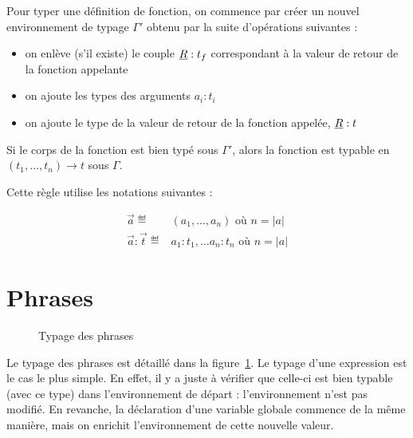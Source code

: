 Pour typer une définition de fonction, on commence par créer un nouvel
environnement de typage $Γ'$ obtenu par la suite d'opérations suivantes :

\begin{itemize}
\item
  on enlève (s'il existe) le couple $\vRet : t_f$ correspondant à la
  valeur de retour de la fonction appelante
\item
  on ajoute les types des arguments $a_i : t_i$
\item
  on ajoute le type de la valeur de retour de la fonction appelée,
  $\vRet : t$
\end{itemize}

Si le corps de la fonction est bien typé sous $Γ'$, alors la fonction est
typable en $(t_1, …, t_n) → t$ sous $Γ$.

\begin{mathpar}
\end{mathpar}

Cette règle utilise les notations suivantes :

\begin{align*}
\vec{a}
\eqdef &
(a_1, …, a_n) \textrm{ où } n = |a|
\\
\vec{a} : \vec{t}
\eqdef &
a_1: t_1,…
a_n: t_n \textrm{ où } n = |a|
\end{align*}


\section{Phrases}

\begin{figure}


  \begin{mathpar}

  \end{mathpar}

  \caption{Typage des phrases}
  \label{fig:typ-ph}

\end{figure}

Le typage des phrases est détaillé dans la figure~\ref{fig:typ-ph}. Le typage
d'une expression est le cas le plus simple. En effet, il y a juste à vérifier
que celle-ci est bien typable (avec ce type) dans l'environnement de départ :
l'environnement n'est pas modifié. En revanche, la déclaration d'une variable
globale commence de la même manière, mais on enrichit l'environnement de cette
nouvelle valeur.


